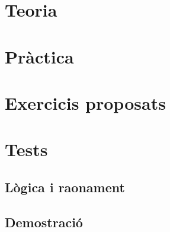 \documentclass[a4paper,12pt]{book}
\begin{document}
\let\cleardoublepage\clearpage

\mainmatter

\chapter{Teoria}



\chapter{Pràctica}



\chapter{Exercicis proposats}



\chapter{Tests}

\section{Lògica i raonament}



\section{Demostració}



\backmatter

\backmatter
\end{document}
